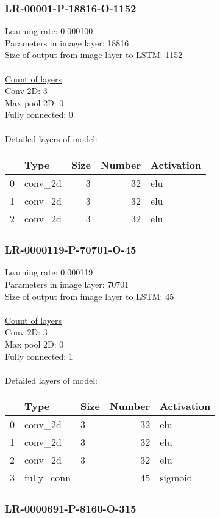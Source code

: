 \subsubsection*{LR-00001-P-18816-O-1152}
Learning rate: 0.000100
\\Parameters in image layer: 18816
\\Size of output from image layer to LSTM: 1152
\\\\\underline{Count of layers} 
\\Conv 2D:           3\\Max pool 2D:      0\\Fully connected:  0
\\\\Detailed layers of model: \\\begin{tabular}{rlrrl}
\hline
    & Type    &   Size &   Number & Activation   \\
\hline
  0 & conv\_2d &      3 &       32 & elu          \\
  1 & conv\_2d &      3 &       32 & elu          \\
  2 & conv\_2d &      3 &       32 & elu          \\
\hline
\end{tabular}\subsubsection*{LR-0000119-P-70701-O-45}
Learning rate: 0.000119
\\Parameters in image layer: 70701
\\Size of output from image layer to LSTM: 45
\\\\\underline{Count of layers} 
\\Conv 2D:           3\\Max pool 2D:      0\\Fully connected:  1
\\\\Detailed layers of model: \\\begin{tabular}{rllrl}
\hline
    & Type       & Size   &   Number & Activation   \\
\hline
  0 & conv\_2d    & 3      &       32 & elu          \\
  1 & conv\_2d    & 3      &       32 & elu          \\
  2 & conv\_2d    & 3      &       32 & elu          \\
  3 & fully\_conn &        &       45 & sigmoid      \\
\hline
\end{tabular}\subsubsection*{LR-0000691-P-8160-O-315}
